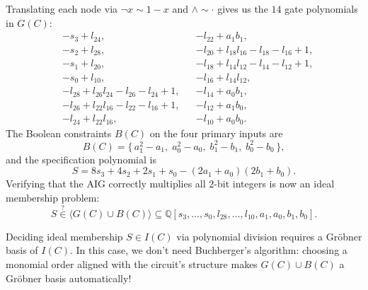 \documentclass[a4paper, 11pt]{report}
\begin{document}
\begin{center}
\end{center}

Translating each node via $\neg x \sim 1 - x$ and $\wedge \sim \cdot$ gives us the $14$ gate polynomials in $G(C)$:
\begin{align*}
    &-s_3 + l_{24}, & &-l_{22} + a_1b_1, \\
    &-s_2 + l_{28}, & &-l_{20} + l_{18}l_{16} - l_{18} - l_{16} + 1, \\
    &-s_1 + l_{20}, & &-l_{18} + l_{14}l_{12} - l_{14} - l_{12} + 1, \\
    &-s_0 + l_{10}, & &-l_{16} + l_{14}l_{12}, \\
    &-l_{28} + l_{26}l_{24} - l_{26} - l_{24} + 1, & &-l_{14} + a_0b_1, \\
    &-l_{26} + l_{22}l_{16} - l_{22} - l_{16} + 1, & &-l_{12} + a_1b_0, \\
    &-l_{24} + l_{22}l_{16}, & &-l_{10} + a_0b_0.
\end{align*}
The Boolean constraints $B(C)$ on the four primary inputs are
$$
    B(C) = \{\, a_1^2 - a_1,\; a_0^2 - a_0,\; b_1^2 - b_1,\; b_0^2 - b_0 \,\},
$$
and the specification polynomial is
$$
    S = 8s_3 + 4s_2 + 2s_1 + s_0 - (2a_1 + a_0)(2b_1 + b_0).
$$
Verifying that the AIG correctly multiplies all $2$-bit integers is now an ideal membership problem:
$$
    S \stackrel{?}{\in} \langle G(C) \cup B(C) \rangle \subseteq \mathbb{Q}[s_3,\dots,s_0, l_{28},\dots,l_{10}, a_1, a_0, b_1, b_0].
$$

\begin{gframe}{}
Deciding ideal membership $S \in I(C)$ via polynomial division requires a Gr\"obner basis of $I(C)$. In this case, we don't need Buchberger's algorithm: choosing a monomial order aligned with the circuit's structure makes $G(C) \cup B(C)$ a Gr\"obner basis automatically!
\end{gframe}
\end{document}
